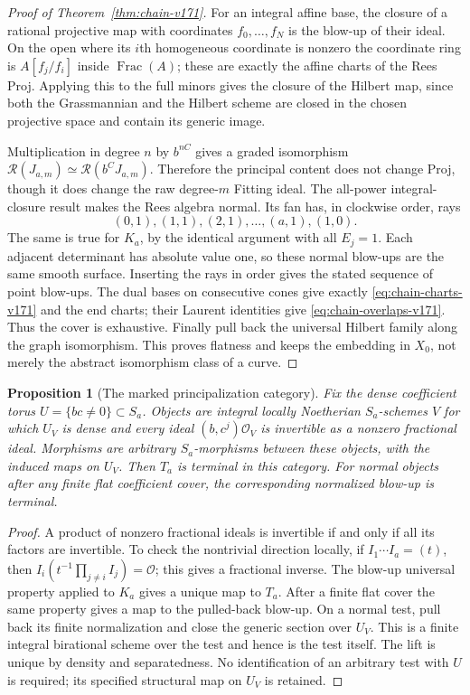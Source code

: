 \documentclass[11pt,reqno]{amsart}
\numberwithin{equation}{section}
\newtheorem{proposition}[theorem]{Proposition}
\theoremstyle{definition}\newtheorem{definition}[theorem]{Definition}
\theoremstyle{remark}\newtheorem{remark}[theorem]{Remark}
\newcommand{\OO}{\mathcal O}\newcommand{\II}{\mathcal I}
\begin{document}
\begin{proof}[Proof of Theorem~\ref{thm:chain-v171}]
For an integral affine base, the closure of a rational projective map
with coordinates $f_0,\ldots,f_N$ is the blow-up of their ideal.
On the open where its $i$th homogeneous coordinate is nonzero the
coordinate ring is $A[f_j/f_i]$ inside $\operatorname{Frac}(A)$;
these are exactly the affine charts of the Rees Proj. Applying this
to the full minors gives the closure of the Hilbert map, since both
the Grassmannian and the Hilbert scheme are closed in the chosen
projective space and contain its generic image.

Multiplication in degree $n$ by $b^{nC}$ gives a graded isomorphism
$\mathcal R(J_{a,m})\simeq\mathcal R(b^CJ_{a,m})$. Therefore the
principal content does not change Proj, though it does change the
raw degree-$m$ Fitting ideal. The all-power integral-closure result
makes the Rees algebra normal. Its fan has, in clockwise order, rays
\[
 (0,1),(1,1),(2,1),\ldots,(a,1),(1,0).
\]
The same is true for $K_a$, by the identical argument with all
$E_j=1$. Each adjacent determinant has absolute value one, so these
normal blow-ups are the same smooth surface. Inserting the rays in
order gives the stated sequence of point blow-ups. The dual bases
on consecutive cones give exactly \eqref{eq:chain-charts-v171}
and the end charts; their Laurent identities give
\eqref{eq:chain-overlaps-v171}. Thus the cover is exhaustive.
Finally pull back the universal Hilbert family along the graph
isomorphism. This proves flatness and keeps the embedding in $X_0$,
not merely the abstract isomorphism class of a curve.
\end{proof}

\begin{proposition}[The marked principalization category]
\label{prop:chain-category-v171}
Fix the dense coefficient torus $U=\{bc\ne0\}\subset S_a$.
Objects are integral locally Noetherian $S_a$-schemes $V$ for which
$U_V$ is dense and every ideal $(b,c^j)\OO_V$ is invertible as a
nonzero fractional ideal. Morphisms are arbitrary $S_a$-morphisms
between these objects, with the induced maps on $U_V$.
Then $T_a$ is terminal in this category. For normal objects after
any finite flat coefficient cover, the corresponding normalized
blow-up is terminal.
\end{proposition}
\begin{proof}
A product of nonzero fractional ideals is invertible if and only if
all its factors are invertible. To check the nontrivial direction
locally, if $I_1\cdots I_a=(t)$, then
$I_i(t^{-1}\prod_{j\ne i}I_j)=\OO$; this gives a fractional inverse.
The blow-up universal property applied to $K_a$ gives a unique map
to $T_a$. After a finite flat cover the same property gives a map to
the pulled-back blow-up. On a normal test, pull back its finite
normalization and close the generic section over $U_V$. This is a
finite integral birational scheme over the test and hence is the
test itself. The lift is unique by density and separatedness.
No identification of an arbitrary test with $U$ is required; its
specified structural map on $U_V$ is retained.
\end{proof}
\end{document}
